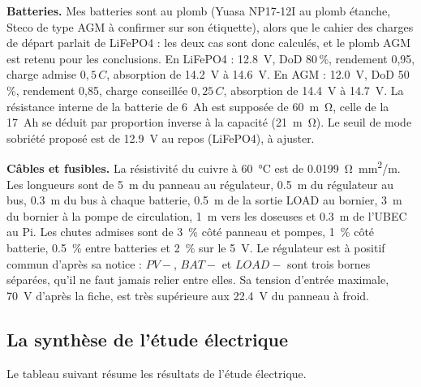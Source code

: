 \textbf{Batteries.} Mes batteries sont au plomb (Yuasa NP17-12I au plomb étanche, Steco de type AGM à confirmer sur son étiquette), alors que le cahier des charges de départ parlait de LiFePO4 : les deux cas sont donc calculés, et le plomb AGM est retenu pour les conclusions. En LiFePO4 : \qty{12,8}{V}, DoD 80\,\%, rendement 0,95, charge admise $0{,}5\,C$, absorption de \qty{14,2}{V} à \qty{14,6}{V}. En AGM : \qty{12,0}{V}, DoD 50\,\%, rendement 0,85, charge conseillée $0{,}25\,C$, absorption de \qty{14,4}{V} à \qty{14,7}{V}. La résistance interne de la batterie de \qty{6}{Ah} est supposée de \qty{60}{m\ohm}, celle de la \qty{17}{Ah} se déduit par proportion inverse à la capacité (\qty{21}{m\ohm}). Le seuil de mode sobriété proposé est de \qty{12,9}{V} au repos (LiFePO4), à ajuster.

\textbf{Câbles et fusibles.} La résistivité du cuivre à \qty{60}{\celsius} est de \qty{0,0199}{\ohm.mm^2/m}. Les longueurs sont de \qty{5}{m} du panneau au régulateur, \qty{0,5}{m} du régulateur au bus, \qty{0,3}{m} du bus à chaque batterie, \qty{0,5}{m} de la sortie LOAD au bornier, \qty{3}{m} du bornier à la pompe de circulation, \qty{1}{m} vers les doseuses et \qty{0,3}{m} de l'UBEC au Pi. Les chutes admises sont de \qty{3}{\percent} côté panneau et pompes, \qty{1}{\percent} côté batterie, \qty{0,5}{\percent} entre batteries et \qty{2}{\percent} sur le \qty{5}{V}. Le régulateur est à positif commun d'après sa notice : $PV-$, $BAT-$ et $LOAD-$ sont trois bornes séparées, qu'il ne faut jamais relier entre elles. Sa tension d'entrée maximale, \qty{70}{V} d'après la fiche, est très supérieure aux \qty{22,4}{V} du panneau à froid.

\subsection{La synthèse de l'étude électrique}

Le tableau suivant résume les résultats de l'étude électrique.

